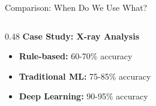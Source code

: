 \documentclass[aspectratio=169, 10pt]{beamer}
\begin{document}
\begin{frame}{Comparison: When Do We Use What?}
\begin{columns}
        \begin{column}{0.48\textwidth}
            \textbf{Case Study: X-ray Analysis}
            \begin{itemize}
                \item \textbf{Rule-based:} 60-70\% accuracy
                \item \textbf{Traditional ML:} 75-85\% accuracy
                \item \textbf{Deep Learning:} 90-95\% accuracy
            \end{itemize}
        \end{column}
    \end{columns}

\end{frame}

\end{document}
